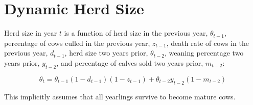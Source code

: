 \documentclass[11pt]{article}
\begin{document}
\section{Dynamic Herd Size}
Herd size in year $t$ is a function of herd size in the previous year, $\theta_{t-1}$, percentage of cows culled in the previous year, $z_{t-1}$, death rate of cows in the previous year, $d_{t-1}$, herd size two years prior, $\theta_{t-2}$, weaning percentage two years prior, $y_{t-2}$, and percentage of calves sold two years prior, $m_{t-2}$:

\begin{equation}
\theta_t = \theta_{t-1} (1- d_{t-1}) (1 - z_{t-1}) + \theta_{t-2} y_{t-2} (1 - m_{t-2})
\end{equation} 

This implicitly assumes that all yearlings survive to become mature cows.
\end{document}

